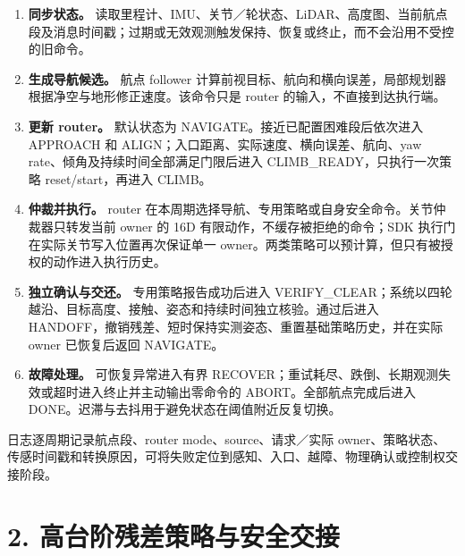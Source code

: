 \documentclass[
  11pt,
  a4paper,
]{article}
\providecommand{\tightlist}{%
  \setlength{\itemsep}{0pt}\setlength{\parskip}{0pt}}
\begin{document}
\begin{enumerate}
\def\labelenumi{\arabic{enumi}.}
\tightlist
\item
  \textbf{同步状态。}
  读取里程计、IMU、关节／轮状态、LiDAR、高度图、当前航点段及消息时间戳；过期或无效观测触发保持、恢复或终止，而不会沿用不受控的旧命令。
\item
  \textbf{生成导航候选。} 航点 follower
  计算前视目标、航向和横向误差，局部规划器根据净空与地形修正速度。该命令只是
  router 的输入，不直接到达执行端。
\item
  \textbf{更新 router。} 默认状态为
  \mbox{\ttfamily\fontsize{8.3}{10.5}\selectfont NAVIGATE}。接近已配置困难段后依次进入
  \mbox{\ttfamily\fontsize{8.3}{10.5}\selectfont APPROACH} 和
  \mbox{\ttfamily\fontsize{8.3}{10.5}\selectfont ALIGN}；入口距离、实际速度、横向误差、航向、yaw
  rate、倾角及持续时间全部满足门限后进入
  \mbox{\ttfamily\fontsize{8.3}{10.5}\selectfont CLIMB\_READY}，只执行一次策略
  reset/start，再进入
  \mbox{\ttfamily\fontsize{8.3}{10.5}\selectfont CLIMB}。
\item
  \textbf{仲裁并执行。} router
  在本周期选择导航、专用策略或自身安全命令。关节仲裁器只转发当前 owner
  的 16D 有限动作，不缓存被拒绝的命令；SDK
  执行门在实际关节写入位置再次保证单一
  owner。两类策略可以预计算，但只有被授权的动作进入执行历史。
\item
  \textbf{独立确认与交还。} 专用策略报告成功后进入
  \mbox{\ttfamily\fontsize{8.3}{10.5}\selectfont VERIFY\_CLEAR}；系统以四轮越沿、目标高度、接触、姿态和持续时间独立核验。通过后进入
  \mbox{\ttfamily\fontsize{8.3}{10.5}\selectfont HANDOFF}，撤销残差、短时保持实测姿态、重置基础策略历史，并在实际
  owner 已恢复后返回
  \mbox{\ttfamily\fontsize{8.3}{10.5}\selectfont NAVIGATE}。
\item
  \textbf{故障处理。} 可恢复异常进入有界
  \mbox{\ttfamily\fontsize{8.3}{10.5}\selectfont RECOVER}；重试耗尽、跌倒、长期观测失效或超时进入终止并主动输出零命令的
  \mbox{\ttfamily\fontsize{8.3}{10.5}\selectfont ABORT}。全部航点完成后进入
  \mbox{\ttfamily\fontsize{8.3}{10.5}\selectfont DONE}。迟滞与去抖用于避免状态在阈值附近反复切换。
\end{enumerate}

日志逐周期记录航点段、router mode、source、请求／实际
owner、策略状态、传感时间戳和转换原因，可将失败定位到感知、入口、越障、物理确认或控制权交接阶段。

\clearpage

\section{2.
高台阶残差策略与安全交接}\label{ux9ad8ux53f0ux9636ux6b8bux5deeux7b56ux7565ux4e0eux5b89ux5168ux4ea4ux63a5}
\end{document}

